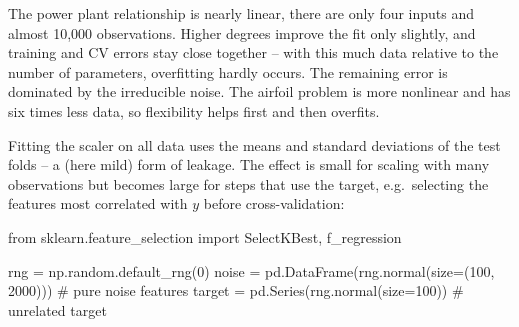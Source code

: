 \documentclass[
  letterpaper,
  DIV=11,
  numbers=noendperiod]{scrreprt}
\newenvironment{Shaded}{\begin{snugshade}}{\end{snugshade}}
\newcommand{\CommentTok}[1]{\textcolor[rgb]{0.37,0.37,0.37}{#1}}
\newcommand{\DecValTok}[1]{\textcolor[rgb]{0.68,0.00,0.00}{#1}}
\newcommand{\ImportTok}[1]{\textcolor[rgb]{0.00,0.46,0.62}{#1}}
\newcommand{\NormalTok}[1]{\textcolor[rgb]{0.00,0.23,0.31}{#1}}
\newcommand{\OperatorTok}[1]{\textcolor[rgb]{0.37,0.37,0.37}{#1}}
\begin{document}
\begin{tcolorbox}
The power plant relationship is nearly linear, there are only four
inputs and almost 10,000 observations. Higher degrees improve the fit
only slightly, and training and CV errors stay close together -- with
this much data relative to the number of parameters, overfitting hardly
occurs. The remaining error is dominated by the irreducible noise. The
airfoil problem is more nonlinear and has six times less data, so
flexibility helps first and then overfits.

\end{tcolorbox}

\begin{tcolorbox}[enhanced jigsaw, left=2mm, title=\textcolor{quarto-callout-caution-color}{\faFire}\hspace{0.5em}{Solution to Exercise 2}, opacityback=0, breakable, rightrule=.15mm, arc=.35mm, toptitle=1mm, colbacktitle=quarto-callout-caution-color!10!white, opacitybacktitle=0.6, coltitle=black, colframe=quarto-callout-caution-color-frame, bottomrule=.15mm, leftrule=.75mm, bottomtitle=1mm, titlerule=0mm, toprule=.15mm, colback=white]

Fitting the scaler on all data uses the means and standard deviations of
the test folds -- a (here mild) form of leakage. The effect is small for
scaling with many observations but becomes large for steps that use the
target, e.g.~selecting the features most correlated with \(y\) before
cross-validation:

\begin{Shaded}
\begin{Highlighting}[]
\ImportTok{from}\NormalTok{ sklearn.feature\_selection }\ImportTok{import}\NormalTok{ SelectKBest, f\_regression}

\NormalTok{rng }\OperatorTok{=}\NormalTok{ np.random.default\_rng(}\DecValTok{0}\NormalTok{)}
\NormalTok{noise }\OperatorTok{=}\NormalTok{ pd.DataFrame(rng.normal(size}\OperatorTok{=}\NormalTok{(}\DecValTok{100}\NormalTok{, }\DecValTok{2000}\NormalTok{)))          }\CommentTok{\# pure noise features}
\NormalTok{target }\OperatorTok{=}\NormalTok{ pd.Series(rng.normal(size}\OperatorTok{=}\DecValTok{100}\NormalTok{))                     }\CommentTok{\# unrelated target}


\end{Highlighting}
\end{Shaded}
\end{tcolorbox}
\end{document}
